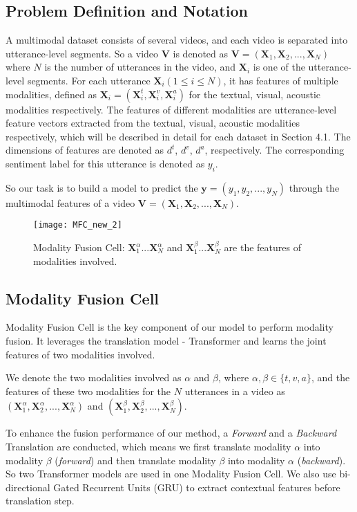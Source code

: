 \documentclass[sigconf]{acmart}
\begin{document}
	\subsection{Problem Definition and Notation}
	A multimodal dataset consists of several videos, and each video is separated into utterance-level segments. So a video $\mathbf{V}$ is denoted as $\mathbf{V}=(\mathbf{X}_1, \mathbf{X}_2, ..., \mathbf{X}_N)$ where $N$ is the number of utterances in the video, and $\mathbf{X}_i$ is one of the utterance-level segments. For each utterance $\mathbf{X}_i (1\le i \le N)$, it has features of multiple modalities, defined as $\mathbf{X}_i = (\mathbf{X}_i^t, \mathbf{X}_i^v, \mathbf{X}_i^a)$ for the textual, visual, acoustic modalities respectively. The features of different modalities are utterance-level feature vectors extracted from the textual, visual, acoustic modalities respectively, which will be described in detail for each dataset in Section 4.1. The dimensions of features are denoted as $d^{t}$, $d^{v}$, $d^{a}$, respectively. The corresponding sentiment label for this utterance is denoted as $y_i$.
	
	So our task is to build a model to predict the $\mathbf{y} = (y_1, y_2, ..., y_N)$ through the multimodal features of a video $\mathbf{V}=(\mathbf{X}_1, \mathbf{X}_2, ..., \mathbf{X}_N)$.
	\begin{figure}[t]
		\centering
		\texttt{[image: MFC\_new\_2]}
		\caption{Modality Fusion Cell: $\mathbf{X}^{\alpha}_{1}...\mathbf{X}^{\alpha}_{N}$ and $\mathbf{X}^{\beta}_{1}...\mathbf{X}^{\beta}_{N}$ are the features of modalities involved.}
		\label{fig:mfc}
	\end{figure}
	
	\subsection{Modality Fusion Cell}
	Modality Fusion Cell is the key component of our model to perform modality fusion. It leverages the translation model - Transformer and learns the joint features of two modalities involved.
	
	We denote the two modalities involved as $\alpha$ and $\beta$, where $\alpha, \beta \in \{t,v,a\}$, and the features of these two modalities for the $N$ utterances in a video as $(\mathbf{X}_1^{\alpha}, \mathbf{X}_2^{\alpha},...,\mathbf{X}_N^{\alpha})$ and $(\mathbf{X}_1^{\beta},\mathbf{X}_2^{\beta},...,\mathbf{X}_N^{\beta})$.
	
	To enhance the fusion performance of our method, a \textit{Forward} and a \textit{Backward} Translation are conducted, which means we first translate modality $\alpha$ into modality $\beta$ (\textit{forward}) and then translate modality $\beta$ into modality $\alpha$ (\textit{backward}). So two Transformer models are used in one Modality Fusion Cell. We also use bi-directional Gated Recurrent Units (GRU) to extract contextual features before translation step.
	
\end{document}
